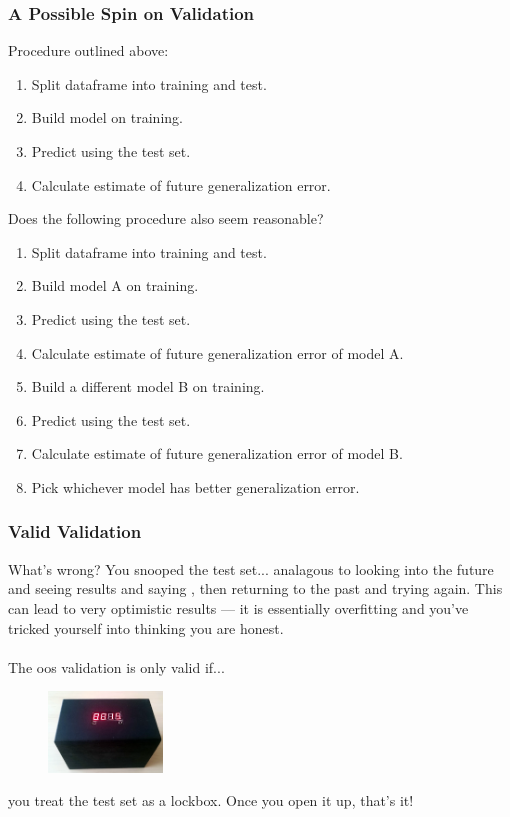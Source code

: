 \documentclass[handout]{beamer}
\begin{document}
\begin{frame}\frametitle{A Possible Spin on Validation}
\footnotesize
Procedure outlined above:
	
\begin{enumerate}\footnotesize
\item Split dataframe into training and test. \pause
\item Build model on training. \pause
\item Predict using the test set. \pause 
\item Calculate estimate of future generalization error.
\end{enumerate}


Does the following procedure also seem reasonable?
	
\begin{enumerate}\footnotesize
\item Split dataframe into training and test.
\item Build model A on training.
\item Predict using the test set. 
\item Calculate estimate of future generalization error of model A. \pause
\item Build a different model B on training. \pause
\item Predict using the test set.  \pause
\item Calculate estimate of future generalization error of model B. \pause
\item Pick whichever model has better generalization error.
\end{enumerate}

\end{frame}

\begin{frame}\frametitle{Valid Validation}

What's wrong? \pause You snooped the test set... \pause analagous to looking into the future and \pause seeing results and saying , \pause then returning to the past and trying again. \pause This can lead to very optimistic results --- it is essentially overfitting and you've tricked yourself into thinking you are honest. \\~\\

\pause The oos validation is only valid if...

\begin{figure}
\centering
\includegraphics[width=1.2in]{lockbox.png}
\end{figure}

you treat the test set as a lockbox. Once you open it up, that's it!
	
\end{frame}
\end{document}
